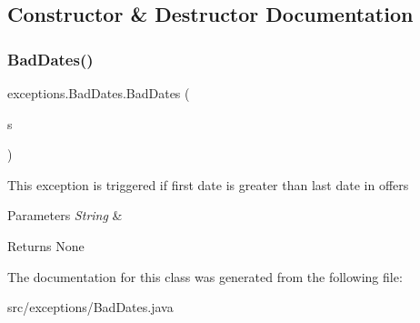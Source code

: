 \subsection{Constructor \& Destructor Documentation}
\mbox{\label{classexceptions_1_1_bad_dates_a34213c984892e85612e3a2e44220e896}} 
\subsubsection{\texorpdfstring{BadDates()}{BadDates()}}
{\footnotesize\ttfamily exceptions.\+Bad\+Dates.\+Bad\+Dates (\begin{DoxyParamCaption}\item[{String}]{s }\end{DoxyParamCaption})}

This exception is triggered if first date is greater than last date in offers 
\begin{DoxyParams}{Parameters}
{\em String} & \\
\hline
\end{DoxyParams}
\begin{DoxyReturn}{Returns}
None 
\end{DoxyReturn}


The documentation for this class was generated from the following file\+:\begin{DoxyCompactItemize}
\item 
src/exceptions/Bad\+Dates.\+java\end{DoxyCompactItemize}
